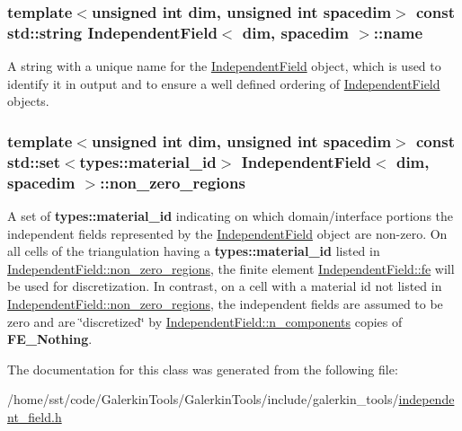 \subsubsection[{\texorpdfstring{name}{name}}]{\setlength{\rightskip}{0pt plus 5cm}template$<$unsigned int dim, unsigned int spacedim$>$ const std\+::string {\bf Independent\+Field}$<$ dim, spacedim $>$\+::name}\hypertarget{class_independent_field_ae05f8565e4ce1a70b5b833555dc084b5}{}\label{class_independent_field_ae05f8565e4ce1a70b5b833555dc084b5}
A string with a unique name for the \hyperlink{class_independent_field}{Independent\+Field} object, which is used to identify it in output and to ensure a well defined ordering of \hyperlink{class_independent_field}{Independent\+Field} objects. 
\subsubsection[{\texorpdfstring{non\+\_\+zero\+\_\+regions}{non_zero_regions}}]{\setlength{\rightskip}{0pt plus 5cm}template$<$unsigned int dim, unsigned int spacedim$>$ const std\+::set$<${\bf types\+::material\+\_\+id}$>$ {\bf Independent\+Field}$<$ dim, spacedim $>$\+::non\+\_\+zero\+\_\+regions}\hypertarget{class_independent_field_a4e09e114870c0b3761bc2e32916e5850}{}\label{class_independent_field_a4e09e114870c0b3761bc2e32916e5850}
A set of {\bf types\+::material\+\_\+id} indicating on which domain/interface portions the independent fields represented by the \hyperlink{class_independent_field}{Independent\+Field} object are non-\/zero. On all cells of the triangulation having a {\bf types\+::material\+\_\+id} listed in \hyperlink{class_independent_field_a4e09e114870c0b3761bc2e32916e5850}{Independent\+Field\+::non\+\_\+zero\+\_\+regions}, the finite element \hyperlink{class_independent_field_a1c583665b7710bd3b815b03ba026b6d3}{Independent\+Field\+::fe} will be used for discretization. In contrast, on a cell with a material id not listed in \hyperlink{class_independent_field_a4e09e114870c0b3761bc2e32916e5850}{Independent\+Field\+::non\+\_\+zero\+\_\+regions}, the independent fields are assumed to be zero and are \char`\"{}discretized\char`\"{} by \hyperlink{class_independent_field_a7b19ea8c30d72cf27f05669de61f30a8}{Independent\+Field\+::n\+\_\+components} copies of {\bf F\+E\+\_\+\+Nothing}. 

The documentation for this class was generated from the following file\+:\begin{DoxyCompactItemize}
\item 
/home/sst/code/\+Galerkin\+Tools/\+Galerkin\+Tools/include/galerkin\+\_\+tools/\hyperlink{independent__field_8h}{independent\+\_\+field.\+h}\end{DoxyCompactItemize}
